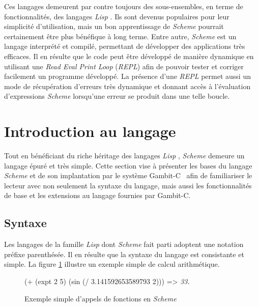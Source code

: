 \documentclass[12pt,twoside,letterpaper,francais]{book}
\newcommand{\lisp}{{\textit{Lisp }}}
\newcommand{\Schemelang}{{\textit{Scheme }}}
\newcommand{\schemeresult}[1]{{\it #1}}
\begin{document}
Ces langages demeurent par contre toujours des sous-ensembles, en
terme de fonctionnalités, des langages \lisp. Ils sont devenus
populaires pour leur simplicité d'utilisation, mais un bon
apprentissage de \Schemelang pourrait certainement être plus bénéfique à
long terme. Entre autre, \Schemelang est un langage interprété et compilé,
permettant de développer des applications très efficaces. Il en
résulte que le code peut être développé de manière dynamique en
utilisant une \textit{Read Eval Print Loop} (\textit{REPL}) afin de
pouvoir tester et corriger facilement un programme développé. La
présence d'une \textit{REPL} permet aussi un mode de récupération
d'erreurs très dynamique et donnant accès à l'évaluation d'expressions
\Schemelang lorsqu'une erreur se produit dans une telle boucle.


\FloatBarrier
\section{Introduction au langage}
Tout en bénéficiant du riche héritage des langages \lisp, \Schemelang
demeure un langage épuré et très simple. Cette section vise à
présenter les bases du langage \Schemelang et de son implantation par le
système Gambit-C~\cite{Gambit4} afin de familiariser le lecteur avec
non seulement la syntaxe du langage, mais aussi les fonctionnalités de
base et les extensions au langage fournies par Gambit-C.


\FloatBarrier
\subsection{Syntaxe}
Les langages de la famille \lisp dont \Schemelang fait parti adoptent une
notation préfixe parenthésée. Il en résulte que la syntaxe du langage
est consistante et simple. La figure \ref{Scheme:simple-ex} illustre
un exemple simple de calcul arithmétique.

\begin{figure}[htb]
  \begin{schemecode}
(+ (expt 2 5) (sin (/ 3.141592653589793 2))) => \schemeresult{33.}
  \end{schemecode}
  \caption{Exemple simple d'appels de fonctions en \Schemelang}
  \label{Scheme:simple-ex}
\end{figure}
\end{document}
